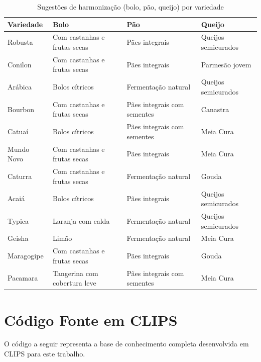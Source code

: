 \documentclass[a4paper,12pt]{article}
\begin{document}
\begin{table}[ht]
\centering
\begin{tabular}{l l l l}
\hline
\textbf{Variedade} & \textbf{Bolo} & \textbf{Pão} & \textbf{Queijo} \\
\hline
Robusta     & Com castanhas e frutas secas & Pães integrais                  & Queijos semicurados \\
Conilon     & Com castanhas e frutas secas & Pães integrais                  & Parmesão jovem      \\
Arábica     & Bolos cítricos               & Fermentação natural             & Queijos semicurados \\
Bourbon     & Com castanhas e frutas secas & Pães integrais com sementes     & Canastra            \\
Catuaí      & Bolos cítricos               & Pães integrais com sementes     & Meia Cura           \\
Mundo Novo  & Com castanhas e frutas secas & Pães integrais                  & Meia Cura           \\
Caturra     & Com castanhas e frutas secas & Fermentação natural             & Gouda               \\
Acaiá       & Bolos cítricos               & Pães integrais                  & Queijos semicurados \\
Typica      & Laranja com calda            & Fermentação natural             & Queijos semicurados \\
Geisha      & Limão                       & Fermentação natural             & Meia Cura           \\
Maragogipe  & Com castanhas e frutas secas & Pães integrais                  & Gouda               \\
Pacamara    & Tangerina com cobertura leve & Pães integrais com sementes     & Meia Cura           \\
\hline
\end{tabular}
\caption{Sugestões de harmonização (bolo, pão, queijo) por variedade}
\label{tab:harmonizacoes}
\end{table}

\FloatBarrier
\appendix
\section{Código Fonte em CLIPS}
\label{sec:codigo_clips}
O código a seguir representa a base de conhecimento completa desenvolvida em CLIPS para este trabalho.





\nocite{counterculture_pourover}
\nocite{embrapa_catalog}
\nocite{perfectdailygrind_geisha}
\nocite{sca_brewing_chart}
\nocite{sca_standard_pdf}
\nocite{wcr_varieties}
\nocite{wikipedia_geisha}
\end{document}
